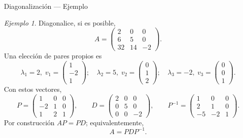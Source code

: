 \documentclass[aspectratio=169,11pt]{beamer}
\theoremstyle{remark}
\newtheorem{Ejem}[definicion]{Ejemplo}
\begin{document}
\begin{frame}[shrink=5]{Diagonalización — Ejemplo}
\footnotesize
\begin{Ejem}

Diagonalice, si es posible,
\[
A=\begin{pmatrix}2 & 0 & 0\\6 & 5 & 0\\32 & 14 & -2\end{pmatrix}.
\]
\scriptsize
Una elección de pares propios es
\[
\lambda_1=2,\;v_1=\begin{pmatrix}1\\-2\\1\end{pmatrix};\quad \lambda_2=5,\;v_2=\begin{pmatrix}0\\1\\2\end{pmatrix};\quad \lambda_3=-2,\;v_3=\begin{pmatrix}0\\0\\1\end{pmatrix}.
\]
Con estos vectores,
\[
P=\begin{pmatrix}1 & 0 & 0\\-2 & 1 & 0\\1 & 2 & 1\end{pmatrix},\qquad D=\begin{pmatrix}2 & 0 & 0\\0 & 5 & 0\\0 & 0 & -2\end{pmatrix},\qquad P^{-1}=\begin{pmatrix}1 & 0 & 0\\2 & 1 & 0\\-5 & -2 & 1\end{pmatrix}.
\]
Por construcción $AP=PD$; equivalentemente,
\[
\boxed{A=PDP^{-1}}.
\]
\end{Ejem}
\end{frame}
\end{document}
